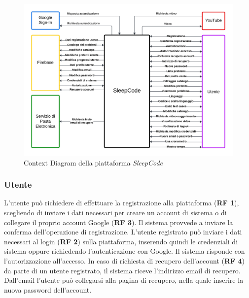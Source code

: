 \documentclass[11pt, a4paper]{article}
\theoremstyle{definition} %
\begin{document}
\begin{figure}[H]
\centering
\hspace*{-2.4cm}
\includegraphics[scale=0.65]{materiale/contextdiagram.pdf}
\caption{Context Diagram della piattaforma \textit{SleepCode}}
\label{contextdiagram}
\end{figure}

\subsubsection*{Utente}
L'utente può richiedere di effettuare la registrazione alla piattaforma
(\textbf{RF 1}), scegliendo di inviare i dati necessari per creare un
account di sistema o di collegare il proprio account Google (\textbf{RF 3}). Il sistema
provvede a inviare la conferma dell'operazione di registrazione.
L'utente registrato può inviare i dati necessari al login (\textbf{RF 2}) sulla piattaforma,
inserendo quindi le credenziali di sistema oppure richiedendo l'autenticazione
con Google. Il sistema risponde con l'autorizzazione all'accesso.
In caso di richiesta di recupero dell'account (\textbf{RF 4}) da parte di un utente
registrato, il sistema riceve l'indirizzo email di recupero. Dall'email
l'utente può collegarsi alla pagina di recupero, nella quale inserire la
nuova password dell'account.
\end{document}
